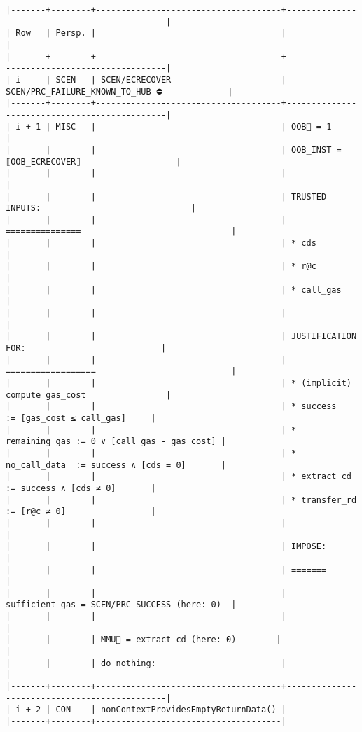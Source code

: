 \documentclass[varwidth=\maxdimen,margin=0.5cm,multi={verbatim}]{standalone}
\begin{document}
\begin{verbatim}
|-------+--------+-------------------------------------+----------------------------------------------|
| Row   | Persp. |                                     |                                              |
|-------+--------+-------------------------------------+----------------------------------------------|
| i     | SCEN   | SCEN/ECRECOVER                      | SCEN/PRC_FAILURE_KNOWN_TO_HUB ⛔             |
|-------+--------+-------------------------------------+----------------------------------------------|
| i + 1 | MISC   |                                     | OOB🏴 = 1                                    |
|       |        |                                     | OOB_INST = ⟦OOB_ECRECOVER⟧                   |
|       |        |                                     |                                              |
|       |        |                                     | TRUSTED INPUTS:                              |
|       |        |                                     | ===============                              |
|       |        |                                     | * cds                                        |
|       |        |                                     | * r@c                                        |
|       |        |                                     | * call_gas                                   |
|       |        |                                     |                                              |
|       |        |                                     | JUSTIFICATION FOR:                           |
|       |        |                                     | ==================                           |
|       |        |                                     | * (implicit) compute gas_cost                |
|       |        |                                     | * success       := [gas_cost ≤ call_gas]     |
|       |        |                                     | * remaining_gas := 0 ∨ [call_gas - gas_cost] |
|       |        |                                     | * no_call_data  := success ∧ [cds = 0]       |
|       |        |                                     | * extract_cd    := success ∧ [cds ≠ 0]       |
|       |        |                                     | * transfer_rd   := [r@c ≠ 0]                 |
|       |        |                                     |                                              |
|       |        |                                     | IMPOSE:                                      |
|       |        |                                     | =======                                      |
|       |        |                                     | sufficient_gas = SCEN/PRC_SUCCESS (here: 0)  |
|       |        |                                     |                                              |
|       |        | MMU🏴 = extract_cd (here: 0)        |                                              |
|       |        | do nothing:                         |                                              |
|-------+--------+-------------------------------------+----------------------------------------------|
| i + 2 | CON    | nonContextProvidesEmptyReturnData() |
|-------+--------+-------------------------------------|
\end{verbatim}
\end{document}

